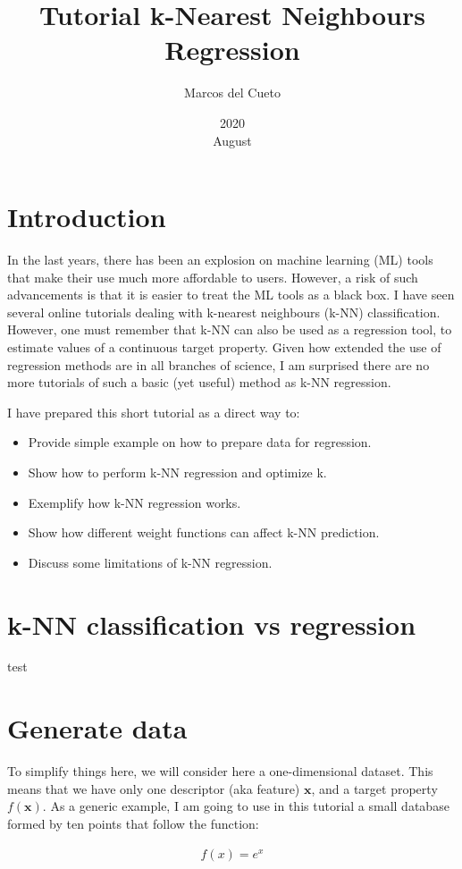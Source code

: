 \documentclass{article}%
\title{Tutorial k-Nearest Neighbours Regression}
\date{2020\\ August}
\author{Marcos del Cueto}
\begin{document}
\maketitle
\section{Introduction}

In the last years, there has been an explosion on machine learning (ML) tools that make their use much more affordable to users. However, a risk of such advancements is that it is easier to treat the ML tools as a black box. I have seen several online tutorials dealing with k-nearest neighbours (k-NN) classification. However, one must remember that k-NN can also be used as a regression tool, to estimate values of a continuous target property. Given how extended the use of regression methods are in all branches of science, I am surprised there are no more tutorials of such a basic (yet useful) method as k-NN regression.

I have prepared this short tutorial as a direct way to:
\begin{itemize}
	\item Provide simple example on how to prepare data for regression.
	\item Show how to perform k-NN regression and optimize k.
	\item Exemplify how k-NN regression works.
	\item Show how different weight functions can affect k-NN prediction.
	\item Discuss some limitations of k-NN regression.
\end{itemize}

\section{k-NN classification vs regression}
test

\section{Generate data}
To simplify things here, we will consider here a one-dimensional dataset. This means that we have only one descriptor (aka feature) $\mathbf{x}$, and a target property $f(\textbf{x})$. As a generic example, I am going to use in this tutorial a small database formed by ten points that follow the function:

\begin{align}
    f(x) = e^{x}
	\label{eqn:exp}
\end{align}
\end{document}

